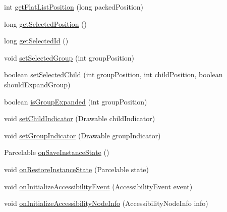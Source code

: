 \begin{DoxyCompactItemize}
\item 
int \hyperlink{classit_1_1sephiroth_1_1android_1_1library_1_1widget_1_1_expandable_h_list_view_a74f94566fd27aaa3a58118a03d5316c9}{get\+Flat\+List\+Position} (long packed\+Position)
\item 
long \hyperlink{classit_1_1sephiroth_1_1android_1_1library_1_1widget_1_1_expandable_h_list_view_afc30e11177c063c70ea97f497a35c314}{get\+Selected\+Position} ()
\item 
long \hyperlink{classit_1_1sephiroth_1_1android_1_1library_1_1widget_1_1_expandable_h_list_view_abfd35f491dbff714972b796f79caa0d6}{get\+Selected\+Id} ()
\item 
void \hyperlink{classit_1_1sephiroth_1_1android_1_1library_1_1widget_1_1_expandable_h_list_view_a2517d46f5019c02f0dafc7ee844ef76b}{set\+Selected\+Group} (int group\+Position)
\item 
boolean \hyperlink{classit_1_1sephiroth_1_1android_1_1library_1_1widget_1_1_expandable_h_list_view_ad04b5fc0710ccfcc489c8a07d0a5a0b5}{set\+Selected\+Child} (int group\+Position, int child\+Position, boolean should\+Expand\+Group)
\item 
boolean \hyperlink{classit_1_1sephiroth_1_1android_1_1library_1_1widget_1_1_expandable_h_list_view_a754e1175ea9d84501f49105519c87565}{is\+Group\+Expanded} (int group\+Position)
\item 
void \hyperlink{classit_1_1sephiroth_1_1android_1_1library_1_1widget_1_1_expandable_h_list_view_a60116cb7b4a6702ef832d3b134a78778}{set\+Child\+Indicator} (Drawable child\+Indicator)
\item 
void \hyperlink{classit_1_1sephiroth_1_1android_1_1library_1_1widget_1_1_expandable_h_list_view_a59484a2d8d2aef838ee794b8bd448982}{set\+Group\+Indicator} (Drawable group\+Indicator)
\item 
Parcelable \hyperlink{classit_1_1sephiroth_1_1android_1_1library_1_1widget_1_1_expandable_h_list_view_a034132d4a356133ce0ead6e9807fcd06}{on\+Save\+Instance\+State} ()
\item 
void \hyperlink{classit_1_1sephiroth_1_1android_1_1library_1_1widget_1_1_expandable_h_list_view_af55454e22c03fb23c2910d7585f46219}{on\+Restore\+Instance\+State} (Parcelable state)
\item 
void \hyperlink{classit_1_1sephiroth_1_1android_1_1library_1_1widget_1_1_expandable_h_list_view_a9a3d98017133a7410b42384574f7ece8}{on\+Initialize\+Accessibility\+Event} (Accessibility\+Event event)
\item 
void \hyperlink{classit_1_1sephiroth_1_1android_1_1library_1_1widget_1_1_expandable_h_list_view_ae6adddbeed36b2d3bc8cb7485ba8e039}{on\+Initialize\+Accessibility\+Node\+Info} (Accessibility\+Node\+Info info)
\end{DoxyCompactItemize}
